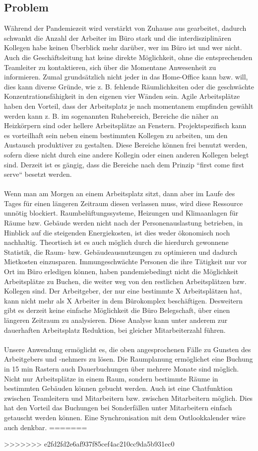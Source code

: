 \documentclass{article}
\begin{document}
\subsection{Problem}
Während der Pandemiezeit wird verstärkt von Zuhause aus gearbeitet, dadurch schwankt die Anzahl der Arbeiter im Büro
stark und die interdisziplinären Kollegen habe keinen Überblick mehr darüber, wer im Büro ist und wer nicht.
Auch die Geschäftsleitung hat keine direkte Möglichkeit, ohne die entsprechenden Teamleiter zu kontaktieren, sich über 
die Momentane Anwesenheit zu informieren.
Zumal grundsätzlich nicht jeder in das Home-Office kann bzw. will, dies kann diverse Gründe, wie z. B. fehlende
Räumlichkeiten oder die geschwächte Konzentrationsfähigkeit in den eigenen vier Wänden sein. Agile Arbeitsplätze
haben den Vorteil, dass der Arbeitsplatz je nach momentanem empfinden gewählt werden kann z. B. im sogenannten Ruhebereich,
Bereiche die näher an Heizkörpern sind oder hellere Arbeitsplätze an Fenstern. Projektspezifisch kann es vorteilhaft sein
neben einem bestimmten Kollegen zu arbeiten, um den Austausch produktiver zu gestalten. Diese Bereiche können frei benutzt werden,
sofern diese nicht durch eine andere Kollegin oder einen anderen Kollegen belegt sind. Derzeit ist es gängig, dass die Bereiche nach
dem Prinzip “first come first serve“ besetzt werden.\\\\
Wenn man am Morgen an einem Arbeitsplatz sitzt, dann aber im Laufe des Tages für einen längeren Zeitraum diesen verlassen muss,
wird diese Ressource unnötig blockiert. Raumbelüftungssysteme, Heizungen und Klimaanlagen für Räume bzw. Gebäude werden nicht
nach der Personenauslastung betrieben, in Hinblick auf die steigenden Energiekosten, ist dies weder ökonomisch noch nachhaltig.
Theortisch ist es auch möglich durch die hierdurch gewonnene Statistik, die Raum- bzw. Gebäudeausnutzungen zu optimieren
und dadurch Mietkosten einzusparen.
Immungeschwächte Personen die ihre Tätigkeit nur vor Ort im Büro erledigen können, haben pandemiebedingt nicht die Möglichkeit
Arbeitsplätze zu Buchen, die weiter weg von den restlichen Arbeitsplätzen bzw. Kollegen sind. Der Arbeitgeber, der nur eine bestimmte
X Arbeitsplätzen hat, kann nicht mehr als X Arbeiter in dem Bürokomplex beschäftigen. Desweitern gibt es derzeit keine einfache Möglichkeit
die Büro Belegschaft, über einen längeren Zeitraum zu analysieren. Diese Analyse kann unter anderem zur dauerhaften Arbeitsplatz Reduktion,
bei gleicher Mitarbeiterzahl führen.\\\\
Unsere Anwendung ermöglicht es, die oben angesprochenen Fälle zu Gunsten des Arbeitgebers und -nehmers zu lösen. 
Die Raumplanung ermöglichet eine Buchung in 15 min Rastern auch Dauerbuchungen über mehrere Monate sind möglich. 
Nicht nur Arbeitsplätze in einem Raum, sondern bestimmte Räume in bestimmten Gebäuden können gebucht werden. 
Auch ist eine Chatfunktion zwischen Teamleitern und Mitarbeitern bzw. zwischen Mitarbeitern möglich. 
Dies hat den Vorteil das Buchungen bei Sonderfällen unter Mitarbeitern einfach getauscht werden können. 
Eine Synchronisation mit dem Outlookkalender wäre auch denkbar.
=======



>>>>>>> e2fd2fd2e6af937f85cef4ac210cc9da5b931ec0



% 


\end{document}
